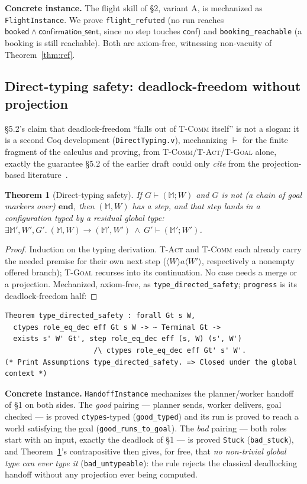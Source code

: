 \documentclass[11pt]{article}
\theoremstyle{plain}
\newtheorem{theorem}{Theorem}
\theoremstyle{definition}
\newcommand{\id}[1]{\texttt{#1}}
\newcommand{\MM}{\mathbb{M}}
\begin{document}
\noindent\textbf{Concrete instance.} The flight skill of \S2, variant A, is
mechanized as \id{FlightInstance}. We prove \id{flight\_refuted} (no run reaches
$\mathsf{booked}\wedge\mathsf{confirmation\_sent}$, since no step touches
$\mathsf{conf}$) and \id{booking\_reachable} (a booking is still reachable). Both
are axiom-free, witnessing non-vacuity of Theorem~\ref{thm:ref}.

\subsection{Direct-typing safety: deadlock-freedom without projection}
\label{sec:safety-meta}
\S5.2's claim that deadlock-freedom ``falls out of \textsc{T-Comm} itself'' is not
a slogan: it is a second Coq development (\id{DirectTyping.v}), mechanizing
$\vdash$ for the finite fragment of the calculus and proving, from
\textsc{T-Comm}/\textsc{T-Act}/\textsc{T-Goal} alone, exactly the guarantee \S5.2
of the earlier draft could only \emph{cite} from the projection-based
literature~\cite{honda,yoshidagheri,scalasyoshida}.
\begin{theorem}[Direct-typing safety]\label{thm:safety}
If $G\vdash(\MM;W)$ and $G$ is not (a chain of goal markers over) $\mathbf{end}$,
then $(\MM,W)$ has a step, and that step lands in a configuration typed by a
residual global type: $\exists\MM',W',G'.\ (\MM,W)\xrightarrow{\ }(\MM',W')\ \wedge\
G'\vdash(\MM';W')$.
\end{theorem}
\begin{proof}
Induction on the typing derivation. \textsc{T-Act} and \textsc{T-Comm} each
already carry the needed premise for their own next step ($\langle W\rangle a
\langle W'\rangle$, respectively a nonempty offered branch); \textsc{T-Goal}
recurses into its continuation. No case needs a merge or a projection.
Mechanized, axiom-free, as \id{type\_directed\_safety}; \id{progress} is its
deadlock-freedom half:
\end{proof}
\begin{lstlisting}[style=coq]
Theorem type_directed_safety : forall Gt s W,
  ctypes role_eq_dec eff Gt s W -> ~ Terminal Gt ->
  exists s' W' Gt', step role_eq_dec eff (s, W) (s', W')
                     /\ ctypes role_eq_dec eff Gt' s' W'.
(* Print Assumptions type_directed_safety. => Closed under the global context *)
\end{lstlisting}
\noindent\textbf{Concrete instance.} \id{HandoffInstance} mechanizes the
planner/worker handoff of \S1 on both sides. The \emph{good} pairing --- planner
sends, worker delivers, goal checked --- is proved \id{ctypes}-typed
(\id{good\_typed}) and its run is proved to reach a world satisfying the goal
(\id{good\_runs\_to\_goal}). The \emph{bad} pairing --- both roles start with an
input, exactly the deadlock of \S1 --- is proved \id{Stuck} (\id{bad\_stuck}), and
Theorem~\ref{thm:safety}'s contrapositive then gives, for free, that
\emph{no non-trivial global type can ever type it} (\id{bad\_untypeable}): the
rule rejects the classical deadlocking handoff without any projection ever being
computed.
\end{document}
